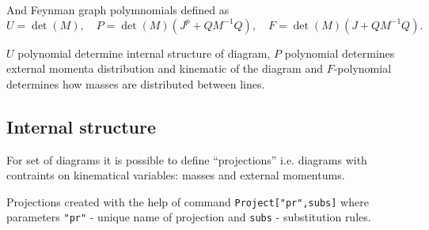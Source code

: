 \documentclass[a4paper,11pt]{article}
\begin{document}
And Feynman graph polymnomials defined as
\begin{equation}
  \label{eq:UFMdef}
  U=\det(M),\quad P=\det(M)(J^p+QM^{-1}Q),\quad F=\det(M)(J+QM^{-1}Q).
\end{equation}

$U$ polynomial determine internal structure of diagram, $P$ polynomial
determines external momenta distribution and kinematic of the diagram
and $F$-polynomial determines how masses are distributed between lines.

\subsection{Internal structure}

For set of diagrams it is possible to define ``projections'' i.e.
diagrams with contraints on kinematical variables: masses and external
momentums.

Projections created with the help of command \texttt{Project["pr",subs]} where
parameters \texttt{"pr"} - unique name of projection and \texttt{subs}
- substitution rules.



 
\end{document}
